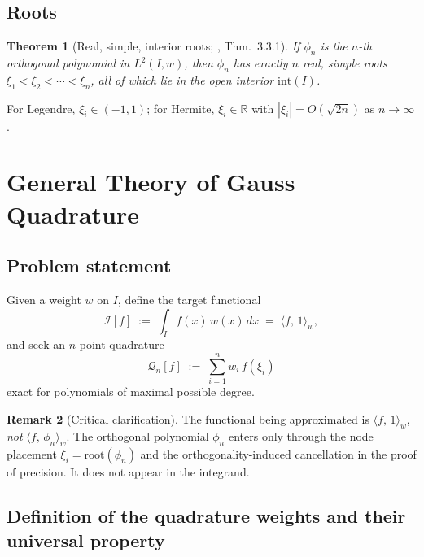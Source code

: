\documentclass[11pt,a4paper]{article}
\newtheorem{theorem}{Theorem}[section]
\theoremstyle{definition}
\newtheorem{remark}[theorem]{Remark}
\newcommand{\R}{\mathbb{R}}
\newcommand{\ipw}[2]{\langle #1,\, #2 \rangle_{w}}
\newcommand{\I}{\mathcal{I}}
\newcommand{\Q}{\mathcal{Q}}
\begin{document}
\subsection{Roots}

\begin{theorem}[Real, simple, interior roots; \cite{Szego1975}, Thm.~3.3.1]
\label{thm:roots}
If $\phi_n$ is the $n$-th orthogonal polynomial in $L^2(I,w)$, then $\phi_n$
has exactly $n$ real, simple roots $\xi_1<\xi_2<\cdots<\xi_n$, all of which lie
in the open interior $\mathrm{int}(I)$.
\end{theorem}

For Legendre, $\xi_i\in(-1,1)$; for Hermite, $\xi_i\in\R$ with
$|\xi_i|=O(\sqrt{2n})$ as $n\to\infty$ \cite[\S6.32]{Szego1975}.

\section{General Theory of Gauss Quadrature}\label{sec:gauss}

\subsection{Problem statement}

Given a weight $w$ on $I$, define the target functional
\begin{equation}
  \I[f] \;:=\; \int_I f(x)\,w(x)\,dx \;=\; \ipw{f}{1},
  \label{eq:target}
\end{equation}
and seek an $n$-point quadrature
\begin{equation}
  \Q_n[f] \;:=\; \sum_{i=1}^n w_i\,f(\xi_i)
  \label{eq:quad}
\end{equation}
exact for polynomials of maximal possible degree.

\begin{remark}[Critical clarification]\label{rmk:critical}
The functional being approximated is $\ipw{f}{1}$, \emph{not} $\ipw{f}{\phi_n}$.
The orthogonal polynomial $\phi_n$ enters only through the node placement
$\xi_i=\mathrm{root}(\phi_n)$ and the orthogonality-induced cancellation in the
proof of precision. It does not appear in the integrand.
\end{remark}

\subsection{Definition of the quadrature weights and their universal property}
\label{sec:weights-def}
\end{document}
